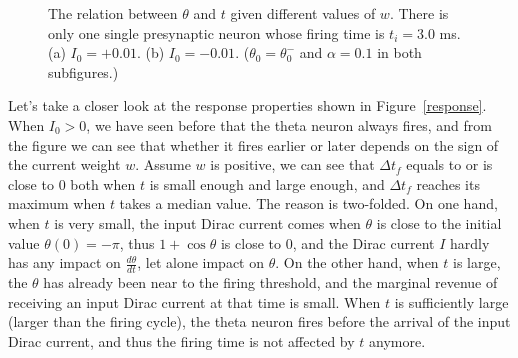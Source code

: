 \begin{figure}
\centering
{}
\caption{The relation between $\theta$ and $t$ given different values of $w$. 
There is only one single presynaptic neuron whose firing time is $t_i = 3.0$ ms.
(a) $I_0 = +0.01$. (b) $I_0 = -0.01$. ($\theta_0 = \theta_0^-$ and $\alpha = 0.1$ in both subfigures.)}
\label{theta_t}
\end{figure}

Let's take a closer look at the response properties shown in Figure~\ref{response}.
When $I_0 > 0$, we have seen before that the theta neuron always fires, and from the figure 
we can see that whether it fires earlier or later depends on the sign of the current weight $w$. 
Assume $w$ is positive, we can see that $\Delta t_f$ equals to or is close to $0$ both when $t$ is
small enough and large enough, and $\Delta t_f$ reaches its maximum when $t$ takes a median value.
The reason is two-folded.
On one hand, when $t$ is very small, the input Dirac current comes when $\theta$ is close to the initial
value $\theta(0) = -\pi$, thus $1+\cos \theta$ is close to $0$, and the Dirac current $I$ hardly has any
impact on $\frac {d \theta}{dt}$, let alone impact on $\theta$.
On the other hand, when $t$ is large, the $\theta$ has already been near
to the firing threshold, and the marginal revenue of receiving an input Dirac current at that time is small.
When $t$ is sufficiently large (larger than the firing cycle), the theta neuron fires before the arrival
of the input Dirac current, and thus the firing time is not affected by $t$ anymore.

